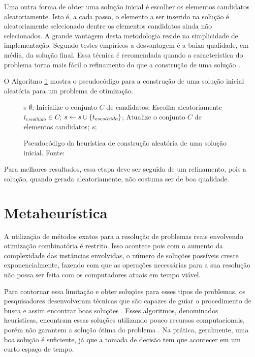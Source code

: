 Uma outra forma de obter uma solução inicial é escolher os elementos
candidatos aleatoriamente. Isto é, a cada passo, o elemento a ser inserido na
solução é aleatoriamente selecionado dentre os elementos candidatos
ainda não selecionados. A grande vantagem desta metodologia reside na
simplicidade de implementação. Segundo testes empíricos a desvantagem é a
baixa qualidade, em média, da solução final. Essa técnica é recomendada quando
a característica do problema torna mais fácil o refinamento do que a construção
de uma solução \cite{notasmarcone}.

O Algoritmo \ref{alg:heurconsaleatoria} mostra o pseudocódigo para a construção
de uma solução inicial aleatória para um problema de otimização.

\begin{figure}[h]
\caption{Pseudocódigo da heurística de construção aleatória de uma
solução inicial. \newline \mbox{Fonte:
\cite{notasmarcone}}}\label{alg:heurconsaleatoria}
\begin{programma}
\STATE s \GETS $\emptyset$;
\STATE Inicialize o conjunto $C$ de candidatos;
\STATE Escolha aleatoriamente $t_{escolhido} \in C$;
\STATE $s \leftarrow s \cup \{t_{escolhido}\}$;
\STATE Atualize o conjunto $C$ de elementos candidatos;
\ENDWHILE
\STATE\RETURN $s$;
\ENDALGORITHM
\end{programma}
\end{figure}

Para melhores resultados, essa etapa deve ser seguida de um refinamento, pois a
solução, quando gerada aleatoriamente, não costuma ser de boa qualidade.

\section{Metaheurística}

A utilização de métodos exatos para a resolução de problemas reais envolvendo
otimização combinatória é restrito. Isso acontece pois com o aumento da
complexidade das instâncias envolvidas, o número de soluções possíveis cresce
exponencialmente, fazendo com que as operações necessárias para a sua resolução
não possa ser feita com os computadores atuais em tempo viável.

Para contornar essa limitação e obter soluções para esses tipos de problemas,
os pesquisadores desenvolveram técnicas que são capazes de guiar o procedimento
de busca e assim encontrar boas soluções \cite{maritan2009}. Esses algoritmos,
denominados heurísticas, encontram essas soluções utilizando pouco recursos
computacionais, porém não garantem a solução ótima do problema \cite{dias2006}.
Na prática, geralmente, uma boa solução é suficiente, já que a tomada de
decisão tem que acontecer em um curto espaço de tempo.

